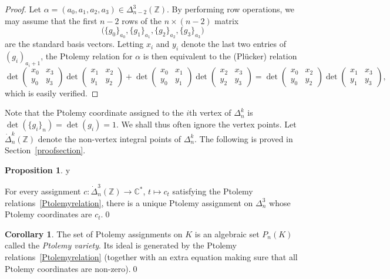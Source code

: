 \documentclass[11pt]{amsart}
\theoremstyle{definition}
\newtheorem{proposition}[theorem]{Proposition}
\newtheorem{corollary}[theorem]{Corollary}
\numberwithin{equation}{section}
\def\printname#1{
        \if\draft y
                \smash{\makebox[0pt]{\hspace{-0.5in}
                        \raisebox{8pt}{\tt\tiny #1}}}
        \fi
}
\def\lbl#1{\label{#1}\printname{#1}}
\newcommand{\C}{\mathbb C}
\newcommand{\Z}{\mathbb Z}
\begin{document}
\begin{proof}
Let $\alpha=(a_0,a_1,a_2,a_3)\in \Delta^3_{n-2}(\Z)$.
By performing row operations, we may assume that the first $n-2$ rows of the $n\times (n-2)$ matrix 
\begin{equation}\big(\{g_0\}_{a_0},\{g_1\}_{a_1},\{g_2\}_{a_2},\{g_3\}_{a_3}\big)\end{equation} 
are the standard basis vectors. Letting $x_i$ and $y_i$ denote the last two entries of $(g_i)_{a_i+1}$, the Ptolemy relation for $\alpha$ is then equivalent to the (Pl\"{u}cker) relation
\begin{equation}
\det\begin{pmatrix}x_0&x_3\\y_0&y_3\end{pmatrix}\det\begin{pmatrix}x_1&x_2\\y_1&y_2\end{pmatrix}+
\det\begin{pmatrix}x_0&x_1\\y_0&y_1\end{pmatrix}\det\begin{pmatrix}x_2&x_3\\y_2&y_3\end{pmatrix}=
\det\begin{pmatrix}x_0&x_2\\y_0&y_2\end{pmatrix}\det\begin{pmatrix}x_1&x_3\\y_1&y_3\end{pmatrix},
\end{equation}
which is easily verified.
\end{proof}

Note that the Ptolemy coordinate assigned to the $i$th vertex of $\Delta^k_n$ is $\det(\{g_i\}_n)=\det(g_i)=1$. We shall thus often ignore the vertex points. Let $\dot\Delta^k_n(\Z)$ denote the non-vertex integral points of $\Delta^k_n$.
The following is proved in Section~\ref{proofsection}.

\begin{proposition}
\lbl{uniquePtolemyassignment}
For every assignment $c\colon\dot\Delta^3_n(\Z)\to\C^*$, $t\mapsto c_t$ satisfying the Ptolemy relations~\eqref{Ptolemyrelation}, there is a unique Ptolemy assignment on $\Delta_n^3$ whose Ptolemy coordinates are $c_t$.\qed
\end{proposition}

\begin{corollary} 
The set of Ptolemy assignments on $K$ is an algebraic set $P_n(K)$ called the \emph{Ptolemy variety}. Its ideal is generated by the Ptolemy relations~\eqref{Ptolemyrelation} (together with an extra equation making sure that all Ptolemy coordinates are non-zero).\qed
\end{corollary}
\end{document}
